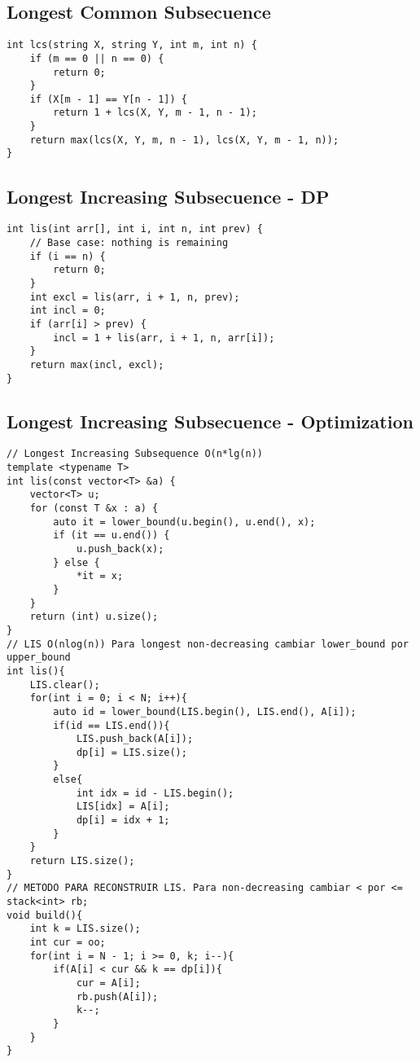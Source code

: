 \documentclass[10pt,letterpaper,twocolumn,twosided]{article}
\begin{document}
\subsection{Longest Common Subsecuence}
\begin{lstlisting}
int lcs(string X, string Y, int m, int n) {
    if (m == 0 || n == 0) {
        return 0;
    }
    if (X[m - 1] == Y[n - 1]) {
        return 1 + lcs(X, Y, m - 1, n - 1);
    }
    return max(lcs(X, Y, m, n - 1), lcs(X, Y, m - 1, n));
}
\end{lstlisting}

\subsection{Longest Increasing Subsecuence - DP}
\begin{lstlisting}
int lis(int arr[], int i, int n, int prev) {
    // Base case: nothing is remaining
    if (i == n) {
        return 0;
    }
    int excl = lis(arr, i + 1, n, prev); 
    int incl = 0;
    if (arr[i] > prev) {
        incl = 1 + lis(arr, i + 1, n, arr[i]);
    }
    return max(incl, excl);
}
\end{lstlisting}

\subsection{Longest Increasing Subsecuence - Optimization}
\begin{lstlisting}
// Longest Increasing Subsequence O(n*lg(n))
template <typename T>
int lis(const vector<T> &a) {
    vector<T> u;
    for (const T &x : a) {
        auto it = lower_bound(u.begin(), u.end(), x);
        if (it == u.end()) {
            u.push_back(x);
        } else {
            *it = x;
        }
    }
    return (int) u.size();
}
// LIS O(nlog(n)) Para longest non-decreasing cambiar lower_bound por upper_bound
int lis(){
    LIS.clear();
    for(int i = 0; i < N; i++){
        auto id = lower_bound(LIS.begin(), LIS.end(), A[i]);
        if(id == LIS.end()){
            LIS.push_back(A[i]);
            dp[i] = LIS.size();
        } 
        else{
            int idx = id - LIS.begin();
            LIS[idx] = A[i];
            dp[i] = idx + 1;
        }
    }
    return LIS.size();
}
// METODO PARA RECONSTRUIR LIS. Para non-decreasing cambiar < por <=
stack<int> rb;
void build(){
    int k = LIS.size();
    int cur = oo;
    for(int i = N - 1; i >= 0, k; i--){
        if(A[i] < cur && k == dp[i]){
            cur = A[i];
            rb.push(A[i]);
            k--;
        }
    }
}
\end{lstlisting}
\end{document}
